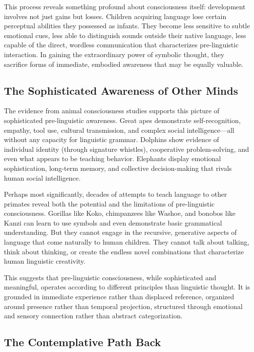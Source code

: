 This process reveals something profound about consciousness itself: development involves not just gains but losses. Children acquiring language lose certain perceptual abilities they possessed as infants. They become less sensitive to subtle emotional cues, less able to distinguish sounds outside their native language, less capable of the direct, wordless communication that characterizes pre-linguistic interaction. In gaining the extraordinary power of symbolic thought, they sacrifice forms of immediate, embodied awareness that may be equally valuable.

\subsection{The Sophisticated Awareness of Other Minds}

The evidence from animal consciousness studies supports this picture of sophisticated pre-linguistic awareness. Great apes demonstrate self-recognition, empathy, tool use, cultural transmission, and complex social intelligence—all without any capacity for linguistic grammar. Dolphins show evidence of individual identity (through signature whistles), cooperative problem-solving, and even what appears to be teaching behavior. Elephants display emotional sophistication, long-term memory, and collective decision-making that rivals human social intelligence.

Perhaps most significantly, decades of attempts to teach language to other primates reveal both the potential and the limitations of pre-linguistic consciousness. Gorillas like Koko, chimpanzees like Washoe, and bonobos like Kanzi can learn to use symbols and even demonstrate basic grammatical understanding. But they cannot engage in the recursive, generative aspects of language that come naturally to human children. They cannot talk about talking, think about thinking, or create the endless novel combinations that characterize human linguistic creativity.

This suggests that pre-linguistic consciousness, while sophisticated and meaningful, operates according to different principles than linguistic thought. It is grounded in immediate experience rather than displaced reference, organized around presence rather than temporal projection, structured through emotional and sensory connection rather than abstract categorization.

\subsection{The Contemplative Path Back}


